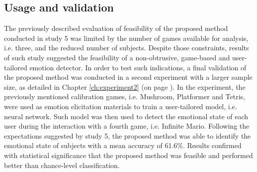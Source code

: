 \subsection{Usage and validation}

The previously described evaluation of feasibility of the proposed method conducted in study 5 was limited by the number of games available for analysis, i.e. three, and the reduced number of subjects. Despite those constraints, results of such study suggested the feasibility of a non-obtrusive, game-based and user-tailored emotion detector. In order to test such indications, a final validation of the proposed method was conducted in a second experiment with a larger sample size, as detailed in Chapter \ref{ch:experiment2} (on page \pageref{ch:experiment2}). In the experiment, the previously mentioned calibration games, i.e. Mushroom, Platformer and Tetris, were used as emotion elicitation materials to train a user-tailored model, i.e. neural network. Such model was then used to detect the emotional state of each user during the interaction with a fourth game, i.e. Infinite Mario. Following the expectations suggested by study 5, the proposed method was able to identify the emotional state of subjects with a mean accuracy of 61.6\%. Results confirmed with statistical significance that the proposed method was feasible and performed better than chance-level classification.

